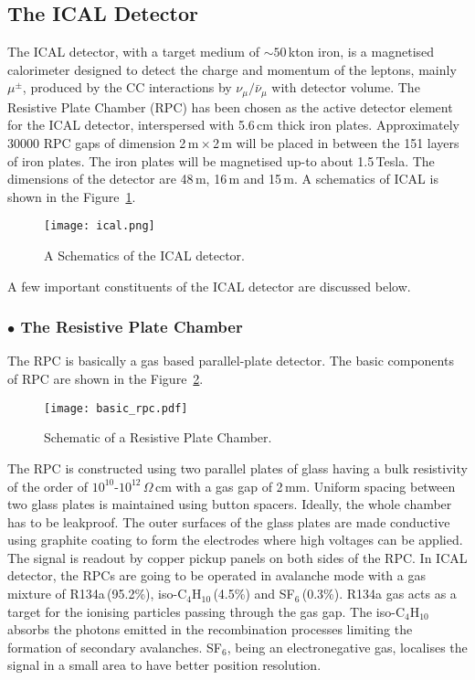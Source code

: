\subsection{The ICAL Detector}
The ICAL detector, with a target medium of $\sim 50$\,kton iron, is a
magnetised calorimeter designed to detect the charge and momentum of
the leptons, mainly $\mu^{\pm}$, produced by the CC interactions by
$\nu_{\mu}/\bar{\nu}_{\mu}$ with detector volume. The Resistive Plate
Chamber (RPC) has been chosen as the active detector element for the
ICAL detector, interspersed with 5.6\,cm thick iron plates.
Approximately 30000 RPC gaps of dimension 2\,m\,$\times$\,2\,m will
be placed in between the 151 layers of iron plates. The iron plates
will be magnetised up-to about 1.5\,Tesla. The dimensions of the
detector are 48\,m, 16\,m and 15\,m. A schematics of ICAL is shown in
the Figure~\ref{fig:icalsk}. 
\begin{figure}[h]
  \centering
  \texttt{[image: ical.png]}
  \caption{A Schematics of the ICAL detector\cite{inoreport}.}
  \label{fig:icalsk}
\end{figure}
A few important constituents of the ICAL detector are discussed below.

\subsubsection*{$\bullet$ The Resistive Plate Chamber}
The RPC is basically a gas based parallel-plate
detector\cite{rpc_p2}. The basic components of RPC are shown in the
Figure~\ref{fig:rpc}. 
\begin{figure}[h]
  \centering
  \texttt{[image: basic\_rpc.pdf]}
  \caption{Schematic of a Resistive Plate Chamber.}
  \label{fig:rpc}
\end{figure}
The RPC is constructed using two parallel plates of glass having a
bulk resistivity of the order of $10^{10}$-$10^{12}$\,$\Omega$\,cm with
a gas gap of 2\,mm. Uniform spacing between two glass plates is
maintained using button spacers. Ideally, the whole chamber has to be
leakproof. The outer surfaces of the glass plates are made conductive
using graphite coating to form the electrodes where high voltages can
be applied. The signal is readout by copper pickup panels on both
sides of the RPC. In ICAL detector, the RPCs are going to be operated
in avalanche mode with a gas mixture of R134a\,(95.2\%),
iso-C$_4$H$_{10}$\,(4.5\%) and SF$_6$\,(0.3\%). R134a gas acts as a
target for the ionising particles passing through the gas gap. The
iso-C$_4$H$_{10}$ absorbs the photons emitted in the recombination
processes limiting the formation of secondary avalanches. SF$_6$,
being an electronegative gas, localises the signal in a small area to
have better position resolution.

